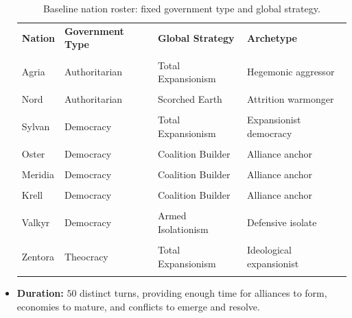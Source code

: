 \begin{itemize}
    \begin{table}[h]
        \centering
        \caption{Baseline nation roster: fixed government type and global strategy.}
        \label{tab:nation_profiles}
        \begin{tabular}{llll}
            \toprule
            \textbf{Nation} & \textbf{Government Type} & \textbf{Global Strategy} & \textbf{Archetype} \\\\
            \midrule
            Agria   & Authoritarian & Total Expansionism  & Hegemonic aggressor \\\\
            Nord    & Authoritarian & Scorched Earth      & Attrition warmonger \\\\
            Sylvan  & Democracy     & Total Expansionism  & Expansionist democracy \\\\
            Oster   & Democracy     & Coalition Builder   & Alliance anchor \\\\
            Meridia & Democracy     & Coalition Builder   & Alliance anchor \\\\
            Krell   & Democracy     & Coalition Builder   & Alliance anchor \\\\
            Valkyr  & Democracy     & Armed Isolationism  & Defensive isolate \\\\
            Zentora & Theocracy     & Total Expansionism  & Ideological expansionist \\\\
            \bottomrule
        \end{tabular}
    \end{table}
    \item \textbf{Duration:} $50$ distinct turns, providing enough time for alliances to form, economies to mature, and conflicts to emerge and resolve.
\end{itemize}

